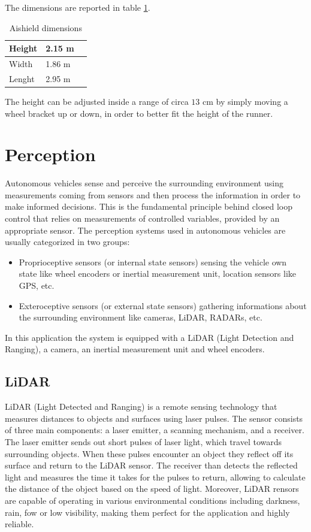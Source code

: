 \documentclass[a4paper,12pt,oneside]{book}
\begin{document}
The dimensions are reported in table \ref{tab:Shield_dimensions}.

\begin{table}[h]
\centering
\begin{tabular}{|p{1.5cm}|p{1.5cm}|p{1.5cm}|}
\hline
Height & 2.15 m \\
\hline
Width & 1.86 m \\
\hline
Lenght & 2.95 m \\
\hline
\end{tabular}
\caption{Aishield dimensions}
\label{tab:Shield_dimensions}
\end{table}
The height can be adjusted inside a range of circa $13$ cm by simply moving a wheel bracket up or down, in order to better fit the height of the runner.

\section{Perception}
Autonomous vehicles sense and perceive the surrounding environment using measurements coming from sensors and then process the information in order to make informed decisions. 
This is the fundamental principle behind closed loop control that relies on measurements of controlled variables, provided by an appropriate sensor.
The perception systems used in autonomous vehicles are usually categorized in two groups:
\begin{itemize}
    \item Proprioceptive sensors (or internal state sensors) sensing the vehicle own state like wheel encoders or inertial measurement unit, location sensors like GPS, etc.
    \item Exteroceptive sensors (or external state sensors) gathering informations about the surrounding environment like cameras, LiDAR, RADARs, etc.
\end{itemize}
In this application the system is equipped with a LiDAR (Light Detection and Ranging), a camera, an inertial measurement unit and wheel encoders.

\subsection*{LiDAR}
LiDAR (Light Detected and Ranging) is a remote sensing technology that measures distances to objects and surfaces using laser pulses. 
The sensor consists of three main components: a laser emitter, a scanning mechanism, and a receiver.
The laser emitter sends out short pulses of laser light, which travel towards surrounding objects. 
When these pulses encounter an object they reflect off its surface and return to the LiDAR sensor.
The receiver than detects the reflected light and measures the time it takes for the pulses to return, allowing to calculate the distance of the object based on the speed of light.
Moreover, LiDAR rensors are capable of operating in various environmental conditions including darkness, rain, fow or low visibility, making them perfect for the application and highly reliable.
\end{document}
